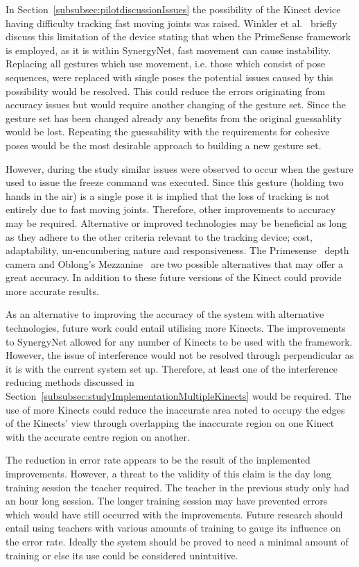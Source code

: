 \documentclass[link]{IWCOMP}
\begin{document}
In Section~\ref{subsubsec:pilotdiscussionIssues} the possibility of the Kinect device having difficulty tracking fast moving joints was raised.
Winkler et al.~\cite{Winkler2012} briefly discuss this limitation of the device stating that when the PrimeSense framework is employed, as it is within SynergyNet, fast movement can cause instability.
Replacing all gestures which use movement, i.e. those which consist of pose sequences, were replaced with single poses the potential issues caused by this possibility would be resolved.
This could reduce the errors originating from accuracy issues but would require another changing of the gesture set.
Since the gesture set has been changed already any benefits from the original guessablity would be lost.
Repeating the guessability with the requirements for cohesive poses would be the most desirable approach to building a new gesture set.

However, during the study similar issues were observed to occur when the gesture used to issue the freeze command was executed.
Since this gesture (holding two hands in the air) is a single pose it is implied that the loss of tracking is not entirely due to fast moving joints.
Therefore, other improvements to accuracy may be required.
Alternative or improved technologies may be beneficial as long as they adhere to the other criteria relevant to the tracking device; cost, adaptability, un-encumbering nature and responsiveness.
The Primesense~\cite{Wilson2010} depth camera and Oblong's Mezzanine~\cite{kramer2011} are two possible alternatives that may offer a great accuracy.
In addition to these future versions of the Kinect could provide more accurate results.

As an alternative to improving the accuracy of the system with alternative technologies, future work could entail utilising more Kinects.
The improvements to SynergyNet allowed for any number of Kinects to be used with the framework.
However, the issue of interference would not be resolved through perpendicular as it is with the current system set up.
Therefore, at least one of the interference reducing methods discussed in Section~\ref{subsubsec:studyImplementationMultipleKinects} would be required.
The use of more Kinects could reduce the inaccurate area noted to occupy the edges of the Kinects' view through overlapping the inaccurate region on one Kinect with the accurate centre region on another.

The reduction in error rate appears to be the result of the implemented improvements.
However, a threat to the validity of this claim is the day long training session the teacher required.
The teacher in the previous study only had an hour long session.
The longer training session may have prevented errors which would have still occurred with the improvements.
Future research should entail using teachers with various amounts of training to gauge its influence on the error rate.
Ideally the system should be proved to need a minimal amount of training or else its use could be considered unintuitive.
\end{document}
